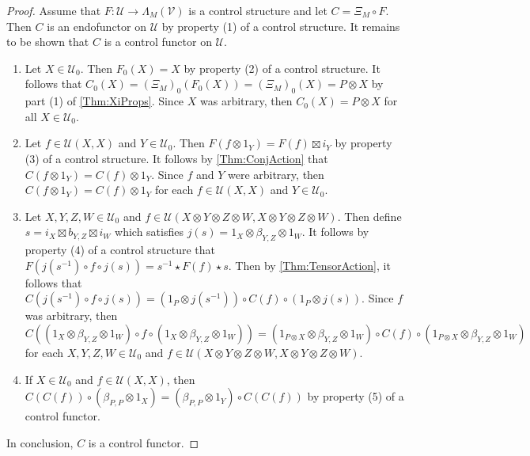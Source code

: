\begin{proof}
    Assume that $F: \mathcal{U} \to \Lambda_M( \mathcal{V} )$ is a control structure and let $C = \Xi_M \circ F$.
    Then $C$ is an endofunctor on $\mathcal{U}$ by property (1) of a control structure.
    It remains to be shown that $C$ is a control functor on $\mathcal{U}$.
    \begin{enumerate}
    \item Let $X \in \mathcal{U}_0$.
          Then $F_0( X ) = X$ by property (2) of a control structure.
          It follows that $C_0( X ) = ( \Xi_M )_0( F_0( X ) ) = ( \Xi_M )_0( X ) = P \otimes X$ by part (1) of \cref{Thm:XiProps}.
          Since $X$ was arbitrary, then $C_0( X ) = P \otimes X$ for all $X \in \mathcal{U}_0$.
    \item Let $f \in \mathcal{U}( X, X )$ and $Y \in \mathcal{U}_0$.
          Then $F( f \otimes 1_Y ) = F( f ) \boxtimes i_Y$ by property (3) of a control structure.
          It follows by \cref{Thm:ConjAction} that $C( f \otimes 1_Y ) = C( f ) \otimes 1_Y$.
          Since $f$ and $Y$ were arbitrary, then $C( f \otimes 1_Y ) = C( f ) \otimes 1_Y$ for each $f \in \mathcal{U}( X, X )$ and $Y \in \mathcal{U}_0$.
    \item Let $X, Y, Z, W \in \mathcal{U}_0$ and $f \in \mathcal{U}( X \otimes Y \otimes Z \otimes W, X \otimes Y \otimes Z \otimes W )$.
          Then define $s = i_X \boxtimes b_{Y,Z} \boxtimes i_W$ which satisfies $j( s ) = 1_X \otimes \beta_{Y,Z} \otimes 1_W$.
          It follows by property (4) of a control structure that $F( j( s^{-1} ) \circ f \circ j( s ) ) = s^{-1} \star F( f ) \star s$.
          Then by \cref{Thm:TensorAction}, it follows that $C( j( s^{-1} ) \circ f \circ j( s ) ) = ( 1_P \otimes j( s^{-1} ) ) \circ C( f ) \circ ( 1_P \otimes j( s ) )$.
          Since $f$ was arbitrary, then $C( ( 1_X \otimes \beta_{Y,Z} \otimes 1_W ) \circ f \circ ( 1_X \otimes \beta_{Y,Z} \otimes 1_W ) ) = ( 1_{P \otimes X} \otimes \beta_{Y,Z} \otimes 1_W ) \circ C( f ) \circ ( 1_{P \otimes X} \otimes \beta_{Y,Z} \otimes 1_W )$ for each $X, Y, Z, W \in \mathcal{U}_0$ and $f \in \mathcal{U}( X \otimes Y \otimes Z \otimes W, X \otimes Y \otimes Z \otimes W )$.
    \item If $X \in \mathcal{U}_0$ and $f \in \mathcal{U}( X, X )$, then $C( C( f ) ) \circ ( \beta_{P,P} \otimes 1_X ) = ( \beta_{P,P} \otimes 1_Y ) \circ C( C( f ) )$ by property (5) of a control functor.
    \end{enumerate}
    In conclusion, $C$ is a control functor.
\end{proof}

